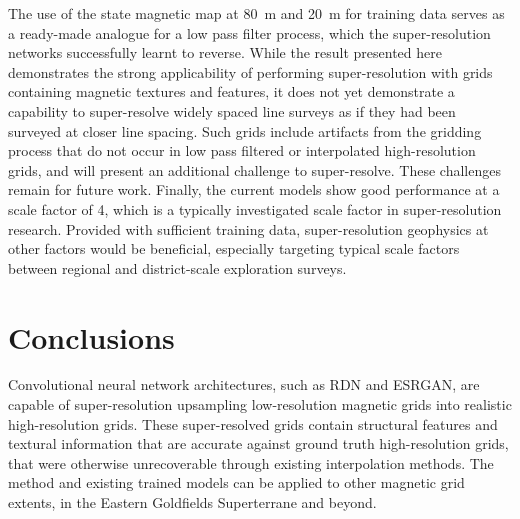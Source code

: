 \documentclass[manuscript.tex]{subfiles}
\begin{document}
The use of the state magnetic map at \SI{80}{\metre} and \SI{20}{\metre} for training data serves as a ready-made analogue for a low pass filter process, which the super-resolution networks successfully learnt to reverse.
While the result presented here demonstrates the strong applicability of performing super-resolution with grids containing magnetic textures and features, it does not yet demonstrate a capability to super-resolve widely spaced line surveys as if they had been surveyed at closer line spacing.
Such grids include artifacts from the gridding process that do not occur in low pass filtered or interpolated high-resolution grids, and will present an additional challenge to super-resolve.
These challenges remain for future work.
Finally, the current models show good performance at a scale factor of \num{4}, which is a typically investigated scale factor in super-resolution research.
Provided with sufficient training data, super-resolution geophysics at other factors would be beneficial, especially targeting typical scale factors between regional and district-scale exploration surveys.

\section{Conclusions}
Convolutional neural network architectures, such as RDN and ESRGAN, are capable of super-resolution upsampling low-resolution magnetic grids into realistic high-resolution grids.
These super-resolved grids contain structural features and textural information that are accurate against ground truth high-resolution grids, that were otherwise unrecoverable through existing interpolation methods.
The method and existing trained models can be applied to other magnetic grid extents, in the Eastern Goldfields Superterrane and beyond.


\printbibliography{}
\end{document}
